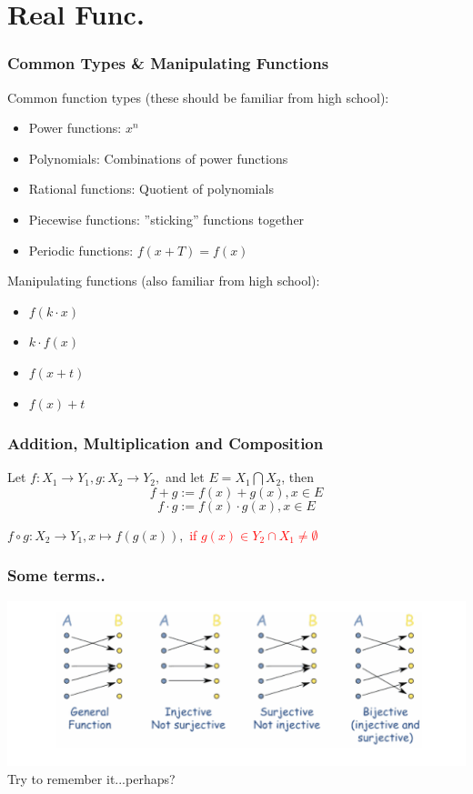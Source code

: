 \documentclass{beamer}
\begin{document}
\section{Real Func.}
\begin{frame}
    \frametitle{Common Types \& Manipulating Functions}
    Common function types (these should be familiar from high school):
    \begin{itemize}
        \item Power functions: $x^n$
        \item Polynomials: Combinations of power functions
        \item Rational functions: Quotient of polynomials
        \item Piecewise functions: ”sticking” functions together 
        \item Periodic functions: $f(x + T) = f(x)$
    \end{itemize}
    Manipulating functions (also familiar from high school):
    \begin{itemize}
        \item  $f(k \cdot x)$
        \item $k \cdot f(x)$
        \item  $f(x + t)$
        \item $f(x) + t$
    \end{itemize}
\end{frame}
\begin{frame}
    \frametitle{Addition, Multiplication and Composition}
    Let $f:X_1 \to Y_1, g:X_2 \to Y_2 ,$ and let $E=X_1 \bigcap X_2$, then
    $$f+g:=f(x)+g(x),x \in E$$
    $$f \cdot g :=f(x) \cdot g(x), x \in E$$
    \begin{center}
    $f \circ g : X_2 \to Y_1, x \mapsto f(g(x)),$ \textcolor{red}{if $g(x)\in Y_2 \cap X_1 \neq \emptyset$}
    \end{center}
\end{frame}
\begin{frame}
    \frametitle{Some terms..}
    \includegraphics[width=1\textwidth]{sur.png} 
    Try to remember it...perhaps?   
\end{frame}
\end{document}
